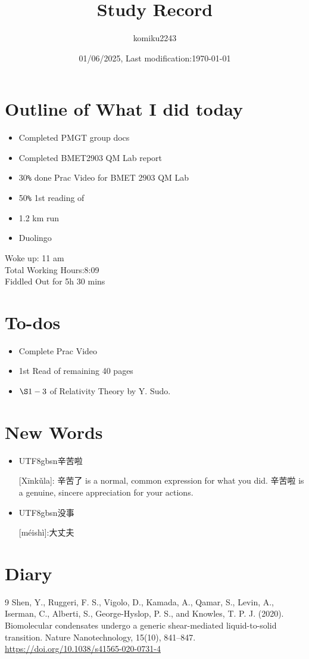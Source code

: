 \documentclass{ltjsarticle}
\title{Study Record}
\date{01/06/2025, Last modification:\today}
\author{komiku2243}
\numberwithin{equation}{subsection}
\newcommand{\Chinese}[1]{{\begin{CJK*}{UTF8}{gbsn}#1\end{CJK*}}}
\begin{document}
\maketitle
\section*{Outline of What I did today}
\begin{itemize}
    \item Completed PMGT group docs
    \item Completed BMET2903 QM Lab report
    \item 30\verb|%| done Prac Video for BMET 2903 QM Lab
    \item 50\verb|%| 1st reading of \cite{yishen1}
    \item 1.2 km run
    \item Duolingo
\end{itemize}
Woke up: 11 am\\
Total Working Hours:8:09\\
Fiddled Out for 5h 30 mins
\section*{}
\newpage
\section*{To-dos}
\begin{itemize}
    \item Complete Prac Video
    \item 1st Read of remaining 40 pages
    \item $\S 1-3$ of Relativity Theory by Y. Sudo. 
\end{itemize}
\section*{New Words}
\begin{itemize}
    \item \Chinese{辛苦啦}[Xīnkǔla]: 辛苦了 is a normal, common expression for what you did. 辛苦啦 is a genuine, sincere appreciation for your actions.
    \item \Chinese{没事}[méishì]:大丈夫
\end{itemize}
\section*{Diary}
\begin{thebibliography}{9}
     Shen, Y., Ruggeri, F. S., Vigolo, D., Kamada, A., Qamar, S., Levin, A., Iserman, C., Alberti, S., George-Hyslop, P. S., and Knowles, T. P. J. (2020). Biomolecular condensates undergo a generic shear-mediated liquid-to-solid transition. Nature Nanotechnology, 15(10), 841--847. \url{https://doi.org/10.1038/s41565-020-0731-4}
\end{thebibliography}
\end{document}
